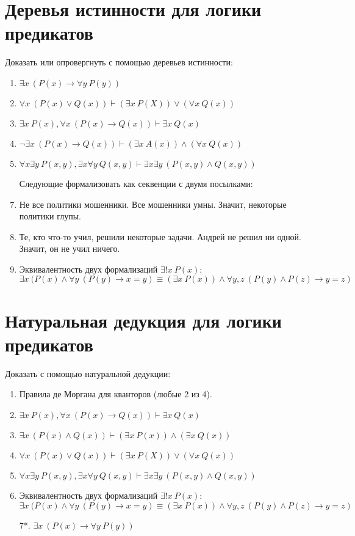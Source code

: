 \documentclass{article}
\begin{document}
\section{Деревья истинности для логики предикатов}
Доказать или опровергнуть с помощью деревьев истинности:
\begin{enumerate}
    \item $\exists x~(P(x) \to \forall y~P(y))$
    \item $\forall x~(P(x) \vee Q(x)) \vdash (\exists x~P(X)) \vee (\forall x~Q(x))$
    \item $\exists x~P(x), \forall x~(P(x) \to Q(x)) \vdash \exists x~Q(x)$
    \item $\neg \exists x~(P(x) \to Q(x)) \vdash (\exists x~A(x)) \land (\forall x~Q(x))$
    \item $\forall x \exists y~P(x,y), \exists x \forall y~Q(x,y) \vdash \exists x \exists y~(P(x,y) \land Q(x,y))$
    \item[] Следующие формализовать как секвенции с двумя посылками:
    \item Не все политики мошенники. Все мошенники умны. Значит, некоторые политики глупы.
    \item Те, кто что-то учил, решили некоторые задачи. Андрей не решил ни одной. Значит, он не учил ничего.
    \item Эквивалентность двух формализаций $\exists! x~P(x)$:\\$\exists x~(P(x) \land \forall y~(P(y) \to x=y) \equiv (\exists x~P(x)) \land \forall y,z~(P(y) \land P(z) \to y=z)$
\end{enumerate}

\section{Натуральная дедукция для логики предикатов}
Доказать с помощью натуральной дедукции:
\begin{enumerate}
    \item Правила де Моргана для кванторов (любые 2 из 4).
    \item $\exists x~P(x), \forall x~(P(x) \to Q(x)) \vdash \exists x~Q(x)$
    \item $\exists x~(P(x) \land Q(x)) \vdash (\exists x~P(x)) \land (\exists x~Q(x))$
    \item $\forall x~(P(x) \vee Q(x)) \vdash (\exists x~P(X)) \vee (\forall x~Q(x))$
    \item $\forall x \exists y~P(x,y), \exists x \forall y~Q(x,y) \vdash \exists x \exists y~(P(x,y) \land Q(x,y))$
    \item Эквивалентность двух формализаций $\exists! x~P(x)$:\\$\exists x~(P(x) \land \forall y~(P(y) \to x=y) \equiv (\exists x~P(x)) \land \forall y,z~(P(y) \land P(z) \to y=z)$
    \item[7*.] $\exists x~(P(x) \to \forall y~P(y))$
\end{enumerate}
\end{document}
